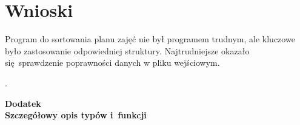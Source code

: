 \documentclass[12pt,a4paper,twoside]{article}
\let\oldmarginpar\marginpar
\renewcommand\marginpar[1]{%
  {\linespread{0.85}\normalfont\scriptsize%
\oldmarginpar[\hspace{1cm}\begin{minipage}{3cm}\raggedleft\scriptsize\color{black}\textsf{#1}\end{minipage}]%
{\hspace{0cm}\begin{minipage}{3cm}\raggedright\scriptsize\color{black}\textsf{#1}\end{minipage}}%
}%
}
\begin{document}
%



\section{Wnioski}
\marginpar{}
Program do sortowania planu zajęć nie był programem trudnym, ale kluczowe było zastosowanie odpowiedniej struktury. Najtrudniejsze okazało się sprawdzenie poprawności danych w pliku wejściowym. 

 
\begin{filecontents}{bibliografia.bib}

}
\end{filecontents}


\cite{id:Cormen2001Wprowadzenie}.




 
\cleardoublepage

\rule{0cm}{0cm}

\vfill

\begin{center}
\Huge\bfseries Dodatek\\Szczegółowy opis typów i~funkcji\par
\end{center}

\vfill 

\rule{0cm}{0cm}
\end{document}
